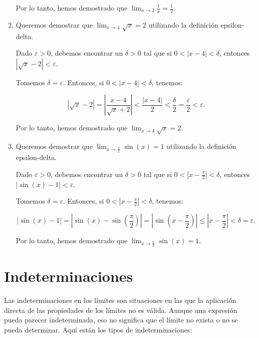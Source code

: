 \documentclass[a4paper,12pt]{article}
\begin{document}
\begin{enumerate}
	Por lo tanto, hemos demostrado que $\lim_{x\to 2} \frac{1}{x} = \frac{1}{2}$.

	\item  Queremos demostrar que $\lim_{x\to 4} \sqrt{x} = 2$ utilizando la definición epsilon-delta.

	Dado $\varepsilon > 0$, debemos encontrar un $\delta > 0$ tal que si $0 < |x - 4| < \delta$, entonces $|\sqrt{x} - 2| < \varepsilon$.

	Tomemos $\delta = \varepsilon$. Entonces, si $0 < |x - 4| < \delta$, tenemos:

	\[
	|\sqrt{x} - 2| = \left|\frac{x - 4}{\sqrt{x} + 2}\right| < \frac{|x - 4|}{2} < \frac{\delta}{2} = \frac{\varepsilon}{2} < \varepsilon.
	\]

	Por lo tanto, hemos demostrado que $\lim_{x\to 4} \sqrt{x} = 2$.

	\item Queremos demostrar que $\lim_{x\to \frac{\pi}{2}} \sin(x) = 1$ utilizando la definición epsilon-delta.

	Dado $\varepsilon > 0$, debemos encontrar un $\delta > 0$ tal que si $0 < |x - \frac{\pi}{2}| < \delta$, entonces $|\sin(x) - 1| < \varepsilon$.

	Tomemos $\delta = \varepsilon$. Entonces, si $0 < |x - \frac{\pi}{2}| < \delta$, tenemos:

	\[
	|\sin(x) - 1| = |\sin(x) - \sin\left(\frac{\pi}{2}\right)| = |\sin(x - \frac{\pi}{2})| \leq |x - \frac{\pi}{2}| < \delta = \varepsilon.
	\]

	Por lo tanto, hemos demostrado que $\lim_{x\to \frac{\pi}{2}} \sin(x) = 1$.


\end{enumerate}


\section*{Indeterminaciones}

Las indeterminaciones en los límites son situaciones en las que la aplicación directa de las propiedades de los límites no es válida. Aunque una expresión pueda parecer indeterminada, eso no significa que el límite no exista o no se pueda determinar. Aquí están los tipos de indeterminaciones:
\end{document}
